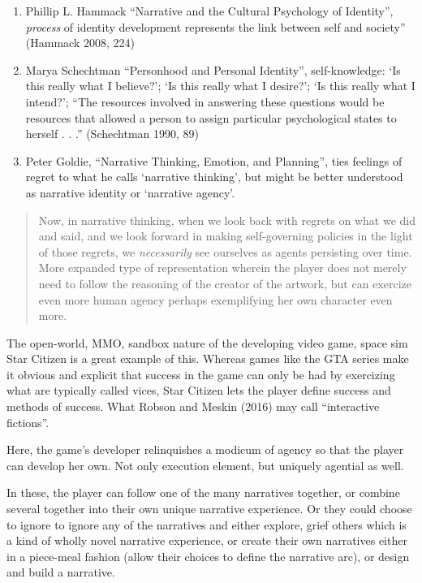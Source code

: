 \documentclass[
  letterpaper,
  DIV=11,
  numbers=noendperiod]{scrreprt}
\providecommand{\tightlist}{%
  \setlength{\itemsep}{0pt}\setlength{\parskip}{0pt}}\usepackage{longtable,booktabs,array}
\begin{document}
\begin{tcolorbox}[enhanced jigsaw, arc=.35mm, breakable, rightrule=.15mm, colback=white, colframe=quarto-callout-important-color-frame, bottomrule=.15mm, leftrule=.75mm, opacityback=0, toprule=.15mm, left=2mm]
\begin{tcolorbox}[enhanced jigsaw, arc=.35mm, breakable, rightrule=.15mm, colback=white, colframe=quarto-callout-tip-color-frame, bottomrule=.15mm, leftrule=.75mm, opacityback=0, toprule=.15mm, left=2mm]
\begin{enumerate}
\def\labelenumi{\arabic{enumi}.}
\tightlist
\item
  Phillip L. Hammack ``Narrative and the Cultural Psychology of
  Identity'', \emph{process} of identity development represents the link
  between self and society'' (Hammack 2008, 224)
\item
  Marya Schechtman ``Personhood and Personal Identity'', self-knowledge:
  `Is this really what I believe?'; `Is this really what I desire?'; `Is
  this really what I intend?'; ``The resources involved in answering
  these questions would be resources that allowed a person to assign
  particular psychological states to herself . . .'' (Schechtman 1990,
  89)
\item
  Peter Goldie, ``Narrative Thinking, Emotion, and Planning'', ties
  feelings of regret to what he calls `narrative thinking', but might be
  better understood as narrative identity or `narrative agency'.
\end{enumerate}

\begin{quote}
Now, in narrative thinking, when we look back with regrets on what we
did and said, and we look forward in making self-governing policies in
the light of those regrets, we \emph{necessarily} see ourselves as
agents persisting over time. More expanded type of representation
wherein the player does not merely need to follow the reasoning of the
creator of the artwork, but can exercize even more human agency perhaps
exemplifying her own character even more.
\end{quote}

The open-world, MMO, sandbox nature of the developing video game, space
sim Star Citizen is a great example of this. Whereas games like the GTA
series make it obvious and explicit that success in the game can only be
had by exercizing what are typically called vices, Star Citizen lets the
player define success and methods of success. What Robson and Meskin
(2016) may call ``interactive fictions''.

Here, the game's developer relinquishes a modicum of agency so that the
player can develop her own. Not only execution element, but uniquely
agential as well.

In these, the player can follow one of the many narratives together, or
combine several together into their own unique narrative experience. Or
they could choose to ignore to ignore any of the narratives and either
explore, grief others which is a kind of wholly novel narrative
experience, or create their own narratives either in a piece-meal
fashion (allow their choices to define the narrative arc), or design and
build a narrative.


\end{tcolorbox}
\end{tcolorbox}
\end{document}
